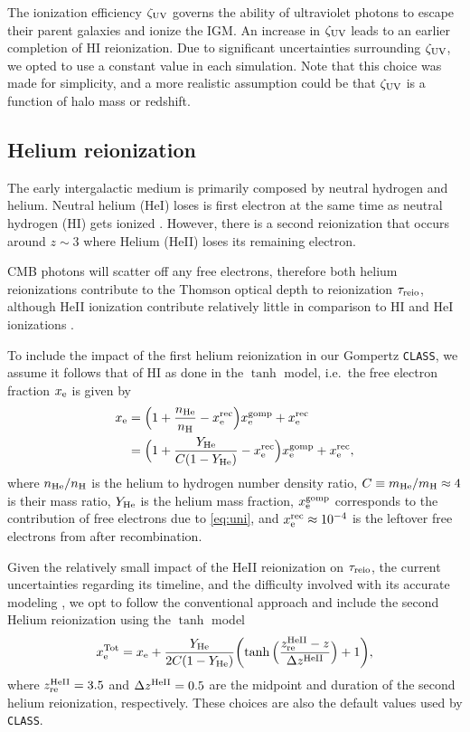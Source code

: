 The ionization efficiency $\zeta_\mathrm{UV}$ governs the ability of ultraviolet
photons to escape their parent galaxies and ionize the IGM. An increase
in $\zeta_\mathrm{UV}$ leads to an earlier completion of HI reionization.
Due to significant uncertainties surrounding $\zeta_\mathrm{UV}$, we opted to use
a constant value in each simulation.
Note that this choice was made for simplicity, and a more realistic
assumption could be that $\zeta_\mathrm{UV}$ is a function of halo mass
\cite{Park2019} or redshift.



\subsection*{Helium reionization}
\label{ssec:helium}

The early intergalactic medium is primarily composed by neutral hydrogen
and helium.
Neutral helium (HeI) loses is first electron at the same time as neutral
hydrogen (HI) gets ionized \cite{Trac2007}.
However, there is a second reionization that occurs around $z\sim3$
where Helium (HeII) loses its remaining electron.

CMB photons will scatter off any free electrons, therefore both helium
reionizations contribute to the Thomson optical depth to reionization
$\tau_{\mathrm{reio}}$, although HeII ionization contribute relatively little in
comparison to HI and HeI ionizations \cite{Liu2016}.

To include the impact of the first helium reionization in our Gompertz
\texttt{CLASS}, we assume it follows that of HI as done in the $\tanh$
model, i.e.\ the free electron fraction $x_{\mathrm{e}}$ is given by
%
\begin{align}
\label{eq:xe_H_He}
x_\e
&= \Bigl(1 + \frac{n_\He}{n_\mathrm{H}} - x^\rec_\e\Bigr) x_\e^\gomp
  + x^\rec_\e
\nonumber\\
%
&= \Bigl(1 + \frac{Y_\He}{C (1 - Y_\He)} - x^\rec_\e\Bigr) x_\e^\gomp
  + x^\rec_\e,
\end{align}
%
where $n_{\mathrm{He}} / n_\mathrm{H}$ is the helium to hydrogen number density
ratio, $C \equiv m_{\mathrm{He}} / m_\mathrm{H} \approx 4$ is their mass ratio,
$Y_{\mathrm{He}}$ is the helium mass fraction, $x_{\mathrm{e}}^{\mathrm{gomp}}$ corresponds to the
contribution of free electrons due to \cref{eq:uni}, and $x^{\mathrm{rec}}_{\mathrm{e}}
\approx 10^{-4}$ is the leftover free electrons from after
recombination.

Given the relatively small impact of the HeII reionization on
$\tau_{\mathrm{reio}}$, the current uncertainties regarding its timeline, and the
difficulty involved with its accurate modeling \cite{Hotinli2023,
Upton2020}, we opt to follow the conventional approach and include the
second Helium reionization using the $\tanh$ model
%
\begin{equation}
\label{eq:xe_tot}
x_{\mathrm{e}}^\mathrm{Tot} = x_{\mathrm{e}} + \frac{Y_{\mathrm{He}}}{2C(1 - Y_{\mathrm{He}})}
  \biggl(\tanh{\Bigl(\frac{z_{\mathrm{re}}^{\mathrm{HeII}}- z}{\Delta z^{\mathrm{HeII}}}\Bigr)} + 1\biggr),
\end{equation}
%
where $z_{\mathrm{re}}^{\mathrm{HeII}} = 3.5$ and $\Delta z^{\mathrm{HeII}} = 0.5$ are the midpoint
and duration of the second helium reionization, respectively.
These choices are also the default values used by \texttt{CLASS}.


